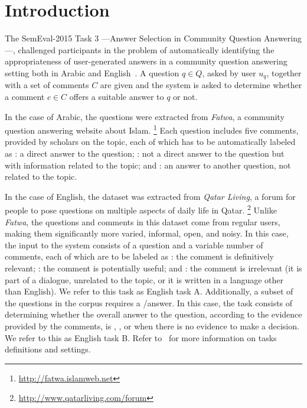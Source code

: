 \section{Introduction}
\label{sec:intro}


The SemEval-2015 Task 3 ---Answer Selection in Community Question Answering---, 
challenged participants in the problem of automatically identifying the 
appropriateness of user-generated answers in a community question answering 
setting both in Arabic and English~\cite{Marquez-EtAl:2015:SemEval}. A question 
$q\in Q$, asked by user $u_q$, together with a set of comments $C$ are given and 
the system is asked to determine whether a comment $c\in C$ offers a suitable 
answer to $q$ or not. 

In the case of Arabic, the questions were extracted from \textit{Fatwa}, a 
community question answering website about Islam.%
\footnote{\url{http://fatwa.islamweb.net}} 
Each question includes five comments, provided by scholars on 
the topic, each of which has to be automatically labeled as 
\Ni \dir: a direct answer to the question;
\Nii \rel: not a direct answer to the question but with information related to 
the topic; and 
\Niii \irel: an answer to another question, not related to the topic. 

In the case of English, the dataset was extracted from \textit{Qatar Living}, 
a forum for people to pose questions on multiple aspects of daily life in 
Qatar.%
\footnote{\url{http://www.qatarliving.com/forum}}
Unlike \textit{Fatwa}, the questions and comments in this dataset come from 
regular users, making them significantly more varied, informal, open, and noisy. 
In this case, the input to the system consists of a question and a variable 
number of comments, each of which are to be labeled as 
\Ni \good: the comment is definitively relevant; 
\Nii \pot: the comment is potentially useful; and 
\Niii \bad: the comment is irrelevant (\eg it is part of a dialogue, unrelated 
to the topic, or it is written in a language other than English). 
We refer to this task as English task A. Additionally, a subset of the questions 
in the corpus requires a \yes/\no answer.
In this case, the task consists of determining whether the overall answer to 
the question, according to the evidence provided by the comments, is 
\Ni \yes, 
\Nii \no, or 
\Niii \unsure when there is no evidence to make a decision. 
We refer to this as English task B. 
Refer to~\cite{Marquez-EtAl:2015:SemEval} for more information on tasks 
definitions and settings.

